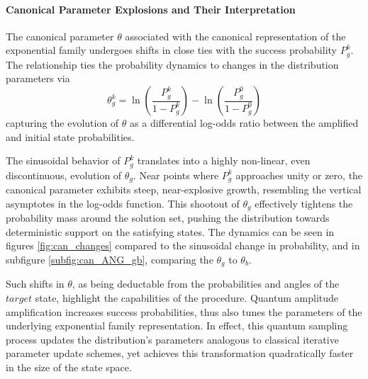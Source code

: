 \documentclass[encoding=utf8,british]{tumphthesis}
\begin{document}
    \paragraph{Canonical Parameter Explosions and Their Interpretation}
    The canonical parameter $\theta$ associated with the canonical representation of the exponential family undergoes shifts in close ties with the 
    success probability $P_g^k$. The relationship ties the probability dynamics to changes in the distribution parameters via
    \begin{equation*}
        \theta_g^k = \ln \left( \frac{P_g^k}{1 - P_g^k} \right) - \ln \left( \frac{P_{g}^0}{1 - P_{g}^0} \right)
    \end{equation*}
    capturing the evolution of $\theta$ as a differential log-odds ratio between the amplified and initial state probabilities.

    The sinusoidal behavior of $P_g^k$ translates into a highly non-linear, even discontinuous, evolution of $\theta_g$. Near points where $P_g^k$ approaches unity or zero, 
    the canonical parameter exhibits steep, near-explosive growth, resembling the vertical asymptotes in the log-odds function. This shootout of $\theta_g$ effectively tightens the probability 
    mass around the solution set, pushing the distribution towards deterministic support on the satisfying states. The dynamics can be seen in figures \ref{fig:can_changes} compared to the sinusoidal
    change in probability, and in subfigure \ref{subfig:can_ANG_gb}, comparing the $\theta_g$ to $\theta_b$.

    \nopagebreak
    Such shifts in $\theta$, as being deductable from the probabilities and angles of the $target$ state, highlight the capabilities of the procedure.
    Quantum amplitude amplification increases success probabilities, thus also tunes the parameters of the underlying exponential family representation. In effect, this quantum sampling process updates 
    the distribution's parameters analogous to classical iterative parameter update schemes, yet achieves this transformation quadratically faster in the size of the state space.
            
\end{document}
